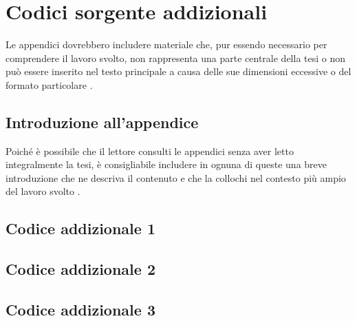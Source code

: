 \chapter{Codici sorgente addizionali}
\label{appendix:codici}

\acresetall

Le appendici dovrebbero includere materiale che, pur essendo necessario per comprendere il lavoro svolto, non rappresenta una parte centrale della tesi o non può essere inserito nel testo principale a causa delle sue dimensioni eccessive o del formato particolare \cite{tuni2019guide}.

\section{Introduzione all'appendice}

Poiché è possibile che il lettore consulti le appendici senza aver letto integralmente la tesi, è consigliabile includere in ognuna di queste una breve introduzione che ne descriva il contenuto e che la collochi nel contesto più ampio del lavoro svolto \cite{tuni2019guide}.

\section{Codice addizionale 1}

\section{Codice addizionale 2}

\section{Codice addizionale 3}